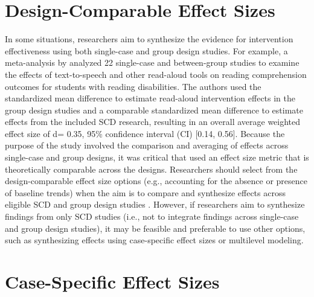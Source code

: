 \documentclass[
]{book}
\begin{document}
\hypertarget{design-comparable-effect-sizes}{%
\section{Design-Comparable Effect Sizes}\label{design-comparable-effect-sizes}}

In some situations, researchers aim to synthesize the evidence for intervention effectiveness using both single-case and group design studies.
For example, a meta-analysis by \citet{wood2018Does} analyzed 22 single-case and between-group studies to examine the effects of text-to-speech and other read-aloud tools on reading comprehension outcomes for students with reading disabilities.
The authors used the standardized mean difference to estimate read-aloud intervention effects in the group design studies and a comparable standardized mean difference to estimate effects from the included SCD research, resulting in an overall average weighted effect size of d= 0.35, 95\% confidence interval (CI) {[}0.14, 0.56{]}.
Because the purpose of the study involved the comparison and averaging of effects across single-case and group designs, it was critical that \citet{wood2018Does} used an effect size metric that is theoretically comparable across the designs.
Researchers should select from the design-comparable effect size options (e.g., accounting for the absence or presence of baseline trends) when the aim is to compare and synthesize effects across eligible SCD and group design studies \citep{Hedges2012ABk, Hedges2012MB, Pustejovsky2014design, Shadish2013d, Swaminathan2014effect, VandenNoortgate2008multilevel}.
However, if researchers aim to synthesize findings from only SCD studies (i.e., not to integrate findings across single-case and group design studies), it may be feasible and preferable to use other options, such as synthesizing effects using case-specific effect sizes or multilevel modeling.

\hypertarget{case-specific-effect-sizes}{%
\section{Case-Specific Effect Sizes}\label{case-specific-effect-sizes}}
\end{document}
